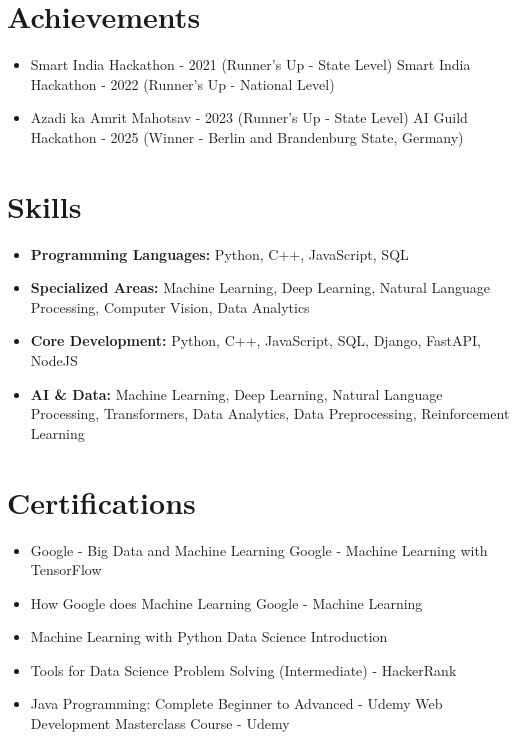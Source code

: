\documentclass[a4paper,10pt]{article}
\begin{document}
\section*{Achievements}
\begin{itemize}
\item Smart India Hackathon - 2021 (Runner's Up - State Level) \hfill Smart India Hackathon - 2022 (Runner's Up - National Level)
\item Azadi ka Amrit Mahotsav - 2023 (Runner's Up - State Level) \hfill AI Guild Hackathon - 2025 (Winner - Berlin and Brandenburg State, Germany)
\end{itemize}

\section*{Skills}
\begin{itemize}
  \item \textbf{Programming Languages:} Python, C++, JavaScript, SQL
  \item \textbf{Specialized Areas:} Machine Learning, Deep Learning, Natural Language Processing, Computer Vision, Data Analytics
  \item \textbf{Core Development:} Python, C++, JavaScript, SQL, Django, FastAPI, NodeJS
  \item \textbf{AI \& Data:} Machine Learning, Deep Learning, Natural Language Processing, Transformers, Data Analytics, Data Preprocessing, Reinforcement Learning
\end{itemize}

\section*{Certifications}
\begin{itemize}
\item Google - Big Data and Machine Learning \hfill Google - Machine Learning with TensorFlow
\item How Google does Machine Learning \hfill Google - Machine Learning
\item Machine Learning with Python \hfill Data Science Introduction
\item Tools for Data Science \hfill Problem Solving (Intermediate) - HackerRank
\item Java Programming: Complete Beginner to Advanced - Udemy \hfill Web Development Masterclass Course - Udemy
\end{itemize}
\end{document}
